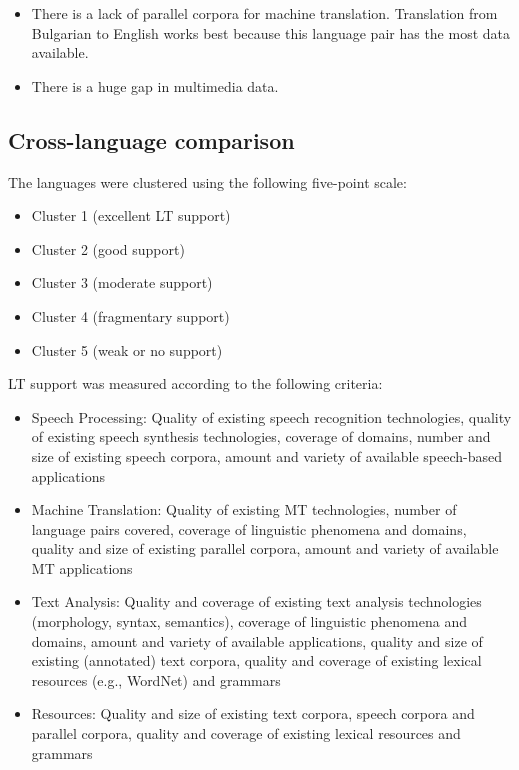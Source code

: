 \begin{multicols}{2}
\begin{itemize}
\item There is a lack of parallel corpora for machine translation. Translation from Bulgarian to English works best because this language pair has the most data available. 

\item There is a huge gap in multimedia data.

\end{itemize}


\subsection{Cross-language comparison}

The languages were clustered using the following five-point scale: 

    \begin{itemize}
      \item Cluster 1 (excellent LT support)
      \item Cluster 2 (good support)
      \item Cluster 3 (moderate support)
      \item Cluster 4 (fragmentary support) 
      \item Cluster 5 (weak or no support)
    \end{itemize}

LT support was measured according to the following criteria:
\begin{itemize}
\item Speech Processing: Quality of existing speech recognition technologies, quality of existing speech synthesis technologies, coverage of domains, number and size of existing speech corpora, amount and variety of available speech-based applications
\item Machine Translation: Quality of existing MT technologies, number of language pairs covered, coverage of linguistic phenomena and domains, quality and size of existing parallel corpora, amount and variety of available MT applications
\item Text Analysis: Quality and coverage of existing text analysis technologies (morphology, syntax, semantics), coverage of linguistic phenomena and domains, amount and variety of available applications, quality and size of existing (annotated) text corpora, quality and coverage of existing lexical resources (e.g., WordNet) and grammars
\item Resources: Quality and size of existing text corpora, speech corpora and parallel corpora, quality and coverage of existing lexical resources and grammars
\end{itemize} 


\end{multicols}
